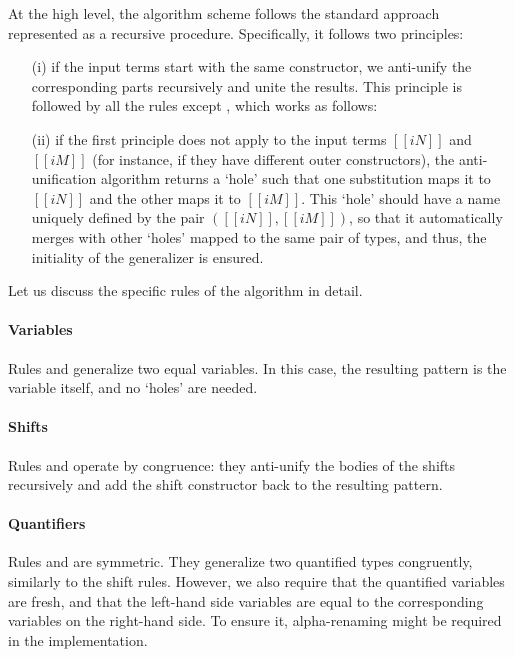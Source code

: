 At the high level, the algorithm scheme follows
the standard approach \cite{plotkin1970:generalization}
represented as a recursive procedure. Specifically, it follows two principles:
\begin{enumerate}
  \item[(i)] if the input terms start with the same constructor,
    we anti-unify the corresponding parts recursively and 
    unite the results. This principle is followed by 
    all the rules except ,
    which works as follows:
  \item[(ii)] if the first principle does not apply to the input terms $[[iN]]$
    and $[[iM]]$ (for instance, if they have different outer constructors), the
    anti-unification algorithm returns a `hole' such that one substitution maps
    it to $[[iN]]$ and the other maps it to $[[iM]]$. This `hole'
    should have a name uniquely defined by the pair $([[iN]], [[iM]])$, so
    that it automatically merges with other `holes' mapped to the same
    pair of types, and thus, the initiality of the generalizer is ensured. 
\end{enumerate}

Let us discuss the specific rules of the algorithm in detail.

\paragraph{Variables} 
  Rules  and
   generalize two equal variables.
  In this case, the resulting pattern is the variable itself,
  and no `holes' are needed.

\paragraph{Shifts} 
  Rules  and
   operate by congruence:
  they anti-unify the bodies of the shifts recursively and add
  the shift constructor back to the resulting pattern.

\paragraph{Quantifiers}
  Rules  and
   are symmetric. 
  They generalize two quantified types congruently, 
  similarly to the shift rules. 
  However, we also require that the quantified variables
  are fresh, and that the left-hand side variables are 
  equal to the corresponding variables on the right-hand side.
  To ensure it, alpha-renaming might be required in the
  implementation.

